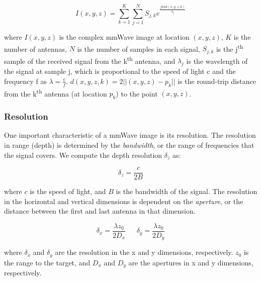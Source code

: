 \vspace{-0.1in}
{\eqsize
\begin{equation}
    I(x,y,z) = \sum_{k=1}^{K} \sum_{j=1}^{N} S_{j,k} e^{\frac{j 2 \pi d(x,y,z,k)}{\lambda_j}}
\label{eq:sar}
\end{equation}
}

\noindent where $I(x,y,z)$ is the complex mmWave image at location $(x,y,z)$, $K$ is the number of antennas, $N$ is the number of samples in each signal, $S_{j,k}$ is the j\textsuperscript{th} sample of the received signal from the k\textsuperscript{th} antenna, and  $\lambda_j$ is the wavelength of the signal at sample j, which is proportional to the speed of light c and the frequency f as $\lambda = \frac{c}{f}$. $d(x,y,z,k)=2||(x,y,z)-p_k||$ is the round-trip distance from the k\textsuperscript{th} antenna (at location $p_k$) to the point $(x,y,z)$.

\vspace{-0.1pt}

\subsubsection{Resolution} 
\vspace{-0.1pt}
One important characteristic of a mmWave image is its resolution. The resolution in range (depth) is determined by the \textit{bandwidth}, or the range of frequencies that the signal covers. We compute the depth resolution $\delta_z$ as:

\vspace{-0.1pt}
{\eqsize
\begin{equation}
    \delta_z = \frac{c}{2B}
\end{equation}}

\noindent where $c$ is the speed of light, and $B$ is the bandwidth of the signal. The resolution in the horizontal and vertical dimensions is dependent on the \textit{aperture}, or the distance between the first and last antenna in that dimension.

\vspace{-0.1pt}
{ \eqsize
\begin{equation}
    \delta_x = \frac{\lambda z_0}{2 D_x} \ \ \ \  \ \ \   \delta_y = \frac{\lambda z_0}{2 D_y}
    \label{eq:res}
\end{equation}}

\noindent where $\delta_x$ and $\delta_y$ are the resolution in the x and y dimensions, respectively. $z_0$ is the range to the target, and $D_x$ and $D_y$ are the apertures in x and y dimensions, respectively.

